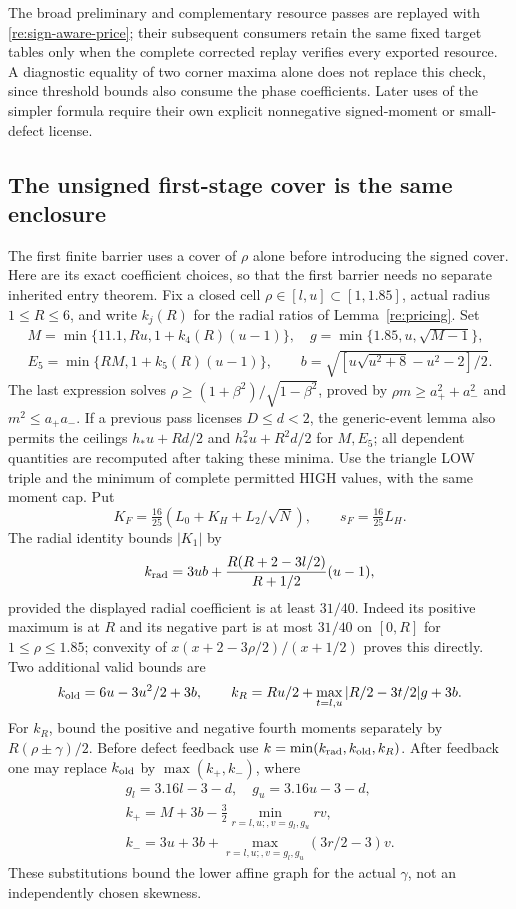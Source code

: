 The broad preliminary and complementary resource passes are replayed with
\eqref{re:sign-aware-price}; their subsequent consumers retain the same
fixed target tables only when the complete corrected replay verifies every
exported resource. A diagnostic equality of two corner maxima alone does
not replace this check, since threshold bounds also consume the phase
coefficients. Later uses of the simpler formula require their own explicit
nonnegative signed-moment or small-defect license.


\subsection{The unsigned first-stage cover is the same enclosure}
\label{re:unsigned}
The first finite barrier uses a cover of $\rho$ alone before introducing
the signed cover. Here are its exact coefficient choices, so that the
first barrier needs no separate inherited entry theorem. Fix a closed
cell $\rho\in[l,u]\subset[1,1.85]$, actual radius $1\le R\le6$, and
write $k_j(R)$ for the radial ratios of Lemma~\ref{re:pricing}. Set
\begin{gather*}
 M=\min\{11.1,Ru,1+k_4(R)(u-1)\},\quad
 g=\min\{1.85,u,\sqrt{M-1}\},\\
 E_5=\min\{RM,1+k_5(R)(u-1)\},\qquad
 b=\sqrt{[u\sqrt{u^2+8}-u^2-2]/2}.
\end{gather*}
The last expression solves $\rho\ge(1+\beta^2)/\sqrt{1-\beta^2}$,
proved by $\rho m\ge a_+^2+a_-^2$ and $m^2\le a_+a_-$.
If a previous pass licenses $D\le d<2$, the generic-event lemma also
permits the ceilings $h_*u+Rd/2$ and $h_*^2u+R^2d/2$ for $M,E_5$;
all dependent quantities are recomputed after taking these minima.
Use the triangle LOW triple and the minimum of complete permitted HIGH
values, with the same moment cap. Put
\[
 K_F=\tfrac{16}{25}(L_0+K_H+L_2/\sqrt N),\qquad s_F=\tfrac{16}{25}L_H.
\]
The radial identity bounds $|K_1|$ by
\[
 k_{\rm rad}=3ub+
     \frac{R(R+2-3l/2)}{R+1/2}(u-1),
\]
provided the displayed radial coefficient is at least $31/40$.
Indeed its positive maximum is at $R$ and its negative part is at most
$31/40$ on $[0,R]$ for $1\le\rho\le1.85$; convexity of
$x(x+2-3\rho/2)/(x+1/2)$ proves this directly.
Two additional valid bounds are
\[
 k_{\rm old}=6u-3u^2/2+3b,\qquad
 k_R=Ru/2+\max_{t=l,u}|R/2-3t/2|g+3b.
\]
For $k_R$, bound the positive and negative fourth moments separately by
$R(\rho\pm\gamma)/2$. Before defect feedback use
$k=\min(k_{\rm rad},k_{\rm old},k_R)$.
After feedback one may replace $k_{\rm old}$ by $\max(k_+,k_-)$, where
\begin{gather*}
 g_l=3.16l-3-d,\quad g_u=3.16u-3-d,\\
 k_+=M+3b-\tfrac32\min_{r=l,u;,v=g_l,g_u}rv,\\
 k_-=3u+3b+\max_{r=l,u;,v=g_l,g_u}(3r/2-3)v.
\end{gather*}
These substitutions bound the lower affine graph for the actual $\gamma$,
not an independently chosen skewness.

